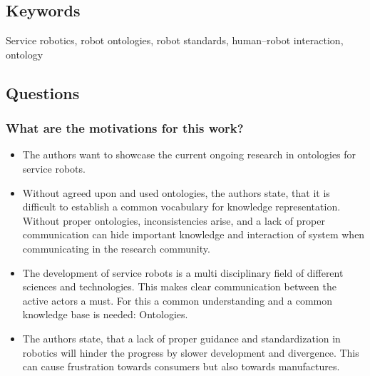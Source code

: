 \subsection*{Keywords}
Service robotics, robot ontologies, robot standards, human–robot interaction, ontology

\subsection*{Questions}
\subsubsection*{What are the motivations for this work?}
\begin{itemize}
    \item The authors want to showcase the current ongoing research in ontologies for service robots. 
    \item Without agreed upon and used ontologies, the authors state, that it is difficult to establish a common vocabulary for knowledge representation. Without proper ontologies, inconsistencies arise, and a lack of proper communication can hide important knowledge and interaction of system when communicating in the research community.
    \item The development of service robots is a multi disciplinary field of different sciences and technologies. This makes clear communication between the active actors a must. For this a common understanding and a common knowledge base is needed: Ontologies.
    \item The authors state, that a lack of proper guidance and standardization in robotics will hinder the progress by slower development and divergence. This can cause frustration towards consumers but also towards manufactures.
\end{itemize}
